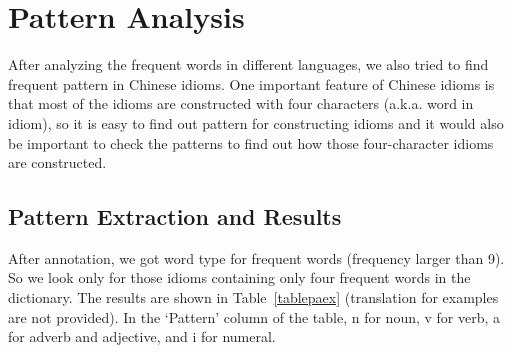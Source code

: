 \section{Pattern Analysis}\label{pattern}
After analyzing the frequent words in different languages, we also tried to find frequent pattern in Chinese idioms. One important feature of Chinese idioms is that most of the idioms are constructed with four characters (a.k.a. word in idiom), so it is easy to find out pattern for constructing idioms and it would also be important to check the patterns to find out how those four-character idioms are constructed. 

\subsection{Pattern Extraction and Results}
After annotation, we got word type for frequent words (frequency larger than 9). So we look only for those idioms containing only four frequent words in the dictionary. The results are shown in Table~\ref{tablepaex} (translation for examples are not provided). In the `Pattern' column of the table, n for noun, v for verb, a for adverb and adjective, and i for numeral. 


